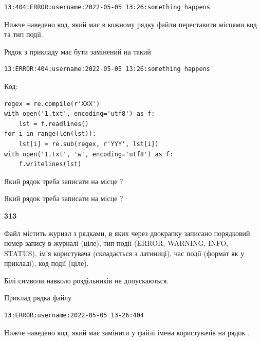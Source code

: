 \begin{verbatim}
13:404:ERROR:username:2022-05-05 13:26:something happens
\end{verbatim}


Нижче наведено код, який має в кожному рядку файли переставити місцями код та тип події.

Рядок з прикладу має бути замінений на такий



\begin{verbatim}
13:ERROR:404:username:2022-05-05 13:26:something happens
\end{verbatim}




Код:



\begin{verbatim}
regex = re.compile(r'XXX')
with open('1.txt', encoding='utf8') as f:
    lst = f.readlines()
for i in range(len(lst)):
    lst[i] = re.sub(regex, r'YYY', lst[i])
with open('1.txt', 'w', encoding='utf8') as f:
    f.writelines(lst)
\end{verbatim}







Який рядок треба записати на місце  ?\par
\vspace{5mm}


Який рядок треба записати на місце  ?\par


\newpage

{\begin {center}\textbf{ 313}\end {center}}\par
Файл  містить журнал з рядками, в яких через двокрапку записано поряд\-ко\-вий номер запису в журналі (ціле), тип події (ERROR, WARNING, INFO, STATUS), ім'я користувача (складається з латиниці), час події (фор\-мат як у прикладі), код події (ціле).

Білі символи навколо роздільників не допускаються.

Приклад рядка файлу



\begin{verbatim}
13:ERROR:username:2022-05-05 13-26:404
\end{verbatim}


Нижче наведено код, який має замінити у файлі імена користувачів на рядок .



